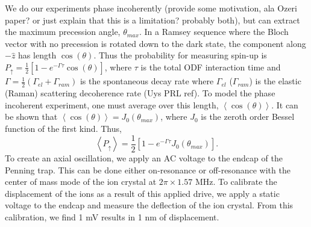 \documentclass[aps,prl,twocolumn,groupedaddress]{revtex4-1}
\begin{document}
We do our experiments phase incoherently (provide some motivation, ala Ozeri paper? or just explain that this is a limitation? probably both), but can extract the maximum precession angle, $\theta_{max}$. In a Ramsey sequence where the Bloch vector with no precession is rotated down to the dark state, the component along $-\hat{z}$ has length $\cos(\theta)$. Thus the probability for measuring spin-up is $P_{\uparrow} = \frac{1}{2}[1-e^{-\Gamma \tau} \cos(\theta)]$, where $\tau$ is the total ODF interaction time and $\Gamma = \frac{1}{2}(\Gamma_{el} + \Gamma_{ram})$ is the spontaneous decay rate where $\Gamma_{el}$ ($\Gamma_{ram}$) is the elastic (Raman) scattering decoherence rate (Uys PRL ref). To model the phase incoherent experiment, one must average over this length, $ \left< \cos(\theta) \right> $. It can be shown that $ \left< \cos(\theta) \right> = J_0(\theta_{max}) $, where $J_0$ is the zeroth order Bessel function of the first kind. Thus,
\begin{equation}
\left< P_{\uparrow} \right> = \frac{1}{2} \left[ 1-e^{-\Gamma \tau}J_0(\theta_{max}) \right].
\end{equation}
To create an axial oscillation, we apply an AC voltage to the endcap of the Penning trap. This can be done either on-resonance or off-resonance with the center of mass mode of the ion crystal at $2\pi \times 1.57$ MHz. To calibrate the displacement of the ions as a result of this applied drive, we apply a static voltage to the endcap and measure the deflection of the ion crystal. From this calibration, we find 1 mV results in 1 nm of displacement.
\end{document}
